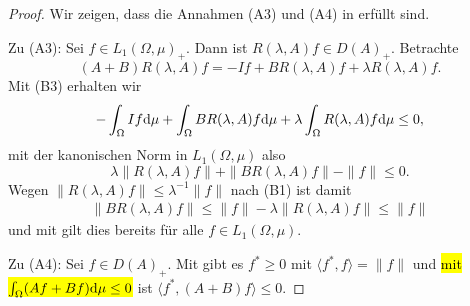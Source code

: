 \begin{proof}
\par
Wir zeigen, dass die Annahmen (A3) und (A4) in  erfüllt sind. 


\par
Zu (A3): Sei $f\in L_1(\Omega,\mu)_+$. Dann ist $R(\lambda, A)f\in D(A)_+$. Betrachte
\begin{equation*}
(A+B)R(\lambda, A)f=-If+BR(\lambda, A)f+\lambda R(\lambda, A)f.
\end{equation*}
Mit (B3) erhalten wir
\begin{equation*}
-\int_\Omega If\textnormal d\mu + \int_\Omega BR(\lambda, A)f\textnormal d\mu + \lambda \int_\Omega R(\lambda, A)f\textnormal d\mu\leq 0,
\end{equation*}
mit der kanonischen Norm in $L_1(\Omega, \mu)$ also
\begin{equation*}
\lambda \|R(\lambda, A)f\| + \|BR(\lambda, A)f\| - \|f\|\leq 0.
\end{equation*}
Wegen $\|R(\lambda, A)f\|\leq \lambda^{-1}\|f\|$ nach  (B1) ist damit 
\begin{align*}
\|BR(\lambda, A)f\|\leq\|f\| - \lambda\|R(\lambda, A)f\|\leq \|f\|
\end{align*}
und mit \Cref{} gilt dies bereits für alle $f\in L_1(\Omega,\mu)$.

\par
Zu (A4): Sei $f\in D(A)_+$.  Mit  gibt es $f^*\geq0$ mit $\langle f^*, f\rangle=\|f\|$ und \hl{mit $\int_\Omega (Af+Bf)\textnormal d\mu\leq 0$} ist $\langle f^*, (A+B)f\rangle\leq 0$. 

\end{proof}






